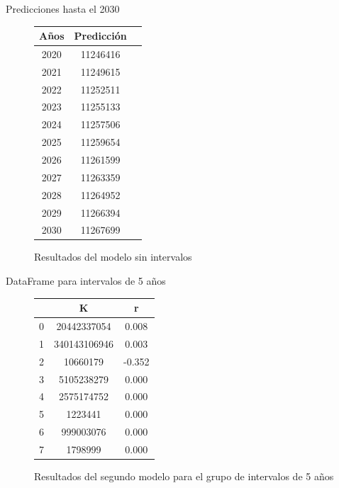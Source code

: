 \documentclass{beamer}
\begin{document}
\begin{frame}{Predicciones hasta el 2030}
    \begin{figure}[h!]%
		\begin{center}
			\begin{tabular}{|c|c|c|} \hline
            Años	& Predicción    \\ \hline
            2020 	& 11246416      \\ \hline
            2021 	& 11249615      \\ \hline
            2022 	& 11252511      \\ \hline
            2023 	& 11255133      \\ \hline
            2024 	& 11257506      \\ \hline
            2025 	& 11259654      \\ \hline
            2026 	& 11261599      \\ \hline
            2027 	& 11263359      \\ \hline
            2028 	& 11264952      \\ \hline
            2029 	& 11266394      \\ \hline
            2030 	& 11267699      \\ \hline
            \end{tabular}
        \caption{Resultados del modelo sin intervalos \label{fig:ex}}
    \end{center}
\end{figure}
\end{frame}
\begin{frame}{DataFrame para intervalos de 5 años}
	\begin{figure}[h!]%
		\begin{center}
			\begin{tabular}{|c|c|c|} \hline
			 			& K 			& r 		\\ \hline
			0 			& 20442337054 	& 0.008  	\\ \hline
			1			& 340143106946 	& 0.003 	\\ \hline
			2			& 	  10660179	& -0.352 	\\ \hline
			3 			&   5105238279	&  0.000	\\ \hline
			4 			& 	2575174752	&  0.000 	\\ \hline
			5 			& 	   1223441	&  0.000	\\ \hline
			6 			& 	 999003076	&  0.000 	\\ \hline
			7 			& 	   1798999	&  0.000 	\\ \hline
			\end{tabular}
		\caption{Resultados del segundo modelo para el grupo de intervalos de 5 años \label{fig:ex}}
	\end{center}
\end{figure}
\end{frame} 
\end{document}
